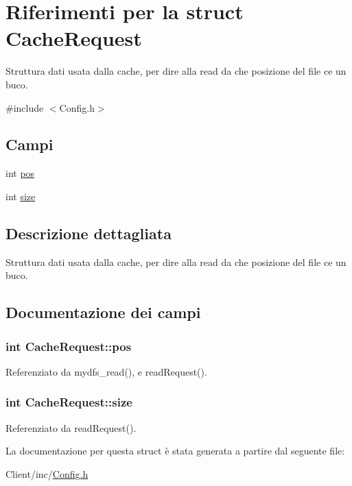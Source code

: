 \hypertarget{structCacheRequest}{}\section{Riferimenti per la struct Cache\+Request}
\label{structCacheRequest}


Struttura dati usata dalla cache, per dire alla read da che posizione del file c\textquotesingle{}e\textquotesingle{} un buco.  




{\ttfamily \#include $<$Config.\+h$>$}

\subsection*{Campi}
\begin{DoxyCompactItemize}
\item 
int \hyperlink{structCacheRequest_a9b1e1f0498ee02f22da75fe915334873}{pos}
\item 
int \hyperlink{structCacheRequest_abc81e438c50064f3dde1835d6146bb1c}{size}
\end{DoxyCompactItemize}


\subsection{Descrizione dettagliata}
Struttura dati usata dalla cache, per dire alla read da che posizione del file c\textquotesingle{}e\textquotesingle{} un buco. 

\subsection{Documentazione dei campi}
\subsubsection[{\texorpdfstring{pos}{pos}}]{\setlength{\rightskip}{0pt plus 5cm}int Cache\+Request\+::pos}\hypertarget{structCacheRequest_a9b1e1f0498ee02f22da75fe915334873}{}\label{structCacheRequest_a9b1e1f0498ee02f22da75fe915334873}


Referenziato da mydfs\+\_\+read(), e read\+Request().

\subsubsection[{\texorpdfstring{size}{size}}]{\setlength{\rightskip}{0pt plus 5cm}int Cache\+Request\+::size}\hypertarget{structCacheRequest_abc81e438c50064f3dde1835d6146bb1c}{}\label{structCacheRequest_abc81e438c50064f3dde1835d6146bb1c}


Referenziato da read\+Request().



La documentazione per questa struct è stata generata a partire dal seguente file\+:\begin{DoxyCompactItemize}
\item 
Client/inc/\hyperlink{Client_2inc_2Config_8h}{Config.\+h}\end{DoxyCompactItemize}
